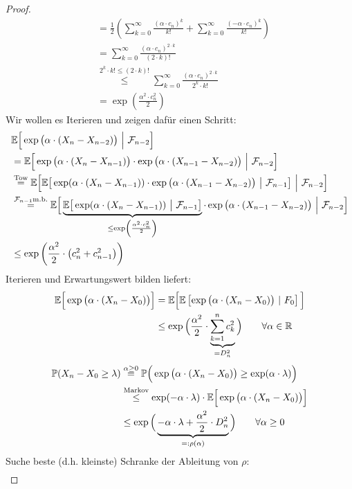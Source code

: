 \begin{proof}
\begin{align*}
&=\frac{1}{2}\left(\sum\limits_{k=0}^\infty\frac{(\alpha\cdot c_n)^{k}}{k!}+\sum\limits_{k=0}^\infty\frac{(-\alpha\cdot c_n)^{k}}{k!}\right)\\
&=\sum\limits_{k=0}^\infty\frac{(\alpha\cdot c_n)^{2\cdot k}}{(2\cdot k)!}\\
&\stackrel{2^k\cdot k! \leq (2\cdot k)!}{\leq}\sum\limits_{k=0}^\infty\frac{(\alpha\cdot c_n)^{2\cdot k}}{2^k\cdot k!}\\
&=\exp\left(\frac{\alpha^2\cdot c_n^2}{2}\right)
\end{align*}
Wir wollen es Iterieren und zeigen dafür einen Schritt:
\begin{align*}
&\mathbb{E}\Big[\exp\big(\alpha\cdot(X_n-X_{n-2})\big)~\Big|~\mathcal{F}_{n-2}\Big]\\
&=\mathbb{E}\Big[\exp\big(\alpha\cdot(X_n-X_{n-1})\big)\cdot\exp\big(\alpha\cdot(X_{n-1}-X_{n-2})\big)~\Big|~\mathcal{F}_{n-2}\Big]\\
&\stackrel{\text{Tow}}{=}
\mathbb{E}\Big[\mathbb{E}\big[\exp(\alpha\cdot(X_n-X_{n-1}))\cdot\exp\big(\alpha\cdot(X_{n-1}-X_{n-2})\big)~\big|~\mathcal{F}_{n-1}\big]~\Big|~\mathcal{F}_{n-2}\Big]\\
&\stackrel{\mathcal{F}_{n-1}\text{m.b.}}{=}
\mathbb{E}\Big[\underbrace{\mathbb{E}\big[\exp(\alpha\cdot(X_n-X_{n-1}))~\big|~\mathcal{F}_{n-1}\big]}_{\leq\exp\left(\frac{\alpha^2\cdot c_n^2}{2}\right)}\cdot\exp\big(\alpha\cdot(X_{n-1}-X_{n-2})\big)~\Big|~\mathcal{F}_{n-2}\Big]\\
&\leq
\exp\left(\frac{\alpha^2}{2}\cdot\left(c_n^2+c_{n-1}^2\right)\right)
\end{align*}
Iterieren und Erwartungswert bilden liefert:
\begin{align*}
\mathbb{E}\Big[\exp\big(\alpha\cdot(X_n-X_0)\big)\Big]
&= \mathbb{E}\Big[\mathbb{E}\left[\exp\big(\alpha\cdot(X_n-X_0)\big)~|~F_0\right]\Big] \\
&\leq\exp\Big(\frac{\alpha^2}{2}\cdot\underbrace{\sum\limits_{k=1}^n c_k^2}_{=D_n^2}\Big)\qquad\forall\alpha\in\mathbb{R}
\end{align*}
\begin{align*}
\mathbb{P}(X_n-X_0\geq\lambda)
&\stackrel{\alpha\geq0}{=}
\mathbb{P}\Big(\exp\big(\alpha\cdot(X_n-X_0)\big)\geq\exp(\alpha\cdot\lambda)\Big)\\
&\stackrel{\text{Markov}}{\leq}
\exp(-\alpha\cdot\lambda)\cdot\mathbb{E}\Big[\exp\big(\alpha\cdot(X_n-X_0)\big)\Big]\\
&\leq
\exp\Big(\underbrace{-\alpha\cdot\lambda+\frac{\alpha^2}{2}\cdot D_n^2}_{=:\rho(\alpha)}\Big)\qquad\forall\alpha\geq0
\end{align*}
Suche beste (d.h. kleinste) Schranke der Ableitung von $\rho$:
\begin{align*}

\end{align*}
\end{proof}
